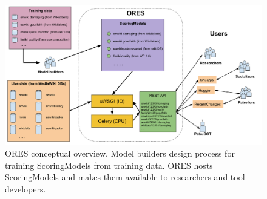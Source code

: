 \begin{figure}[h]
  \centering
  \includegraphics[width=.95\textwidth]{figures/ores_data_user_diagram}
  \caption{ORES conceptual overview.  Model builders design process for training ScoringModels from training data.  ORES hosts ScoringModels and makes them available to researchers and tool developers.}
  \label{fig:ores_data_user}
\end{figure}
